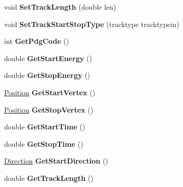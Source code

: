 \begin{DoxyCompactItemize}
\item 
\hypertarget{classParticle_a09fe260918298982e88d085bc02e367b}{void {\bfseries Set\-Track\-Length} (double len)}\label{classParticle_a09fe260918298982e88d085bc02e367b}

\item 
\hypertarget{classParticle_a9ab8ff63c2cdd3c634ef03d9a96d05a0}{void {\bfseries Set\-Track\-Start\-Stop\-Type} (tracktype tracktypein)}\label{classParticle_a9ab8ff63c2cdd3c634ef03d9a96d05a0}

\item 
\hypertarget{classParticle_ac4aef1157eca6d3e79adabca530b3b30}{int {\bfseries Get\-Pdg\-Code} ()}\label{classParticle_ac4aef1157eca6d3e79adabca530b3b30}

\item 
\hypertarget{classParticle_aa8a441034e0e6671e5e9067b2feb2532}{double {\bfseries Get\-Start\-Energy} ()}\label{classParticle_aa8a441034e0e6671e5e9067b2feb2532}

\item 
\hypertarget{classParticle_aedd7d21b6a8008a093499d604c72c8b2}{double {\bfseries Get\-Stop\-Energy} ()}\label{classParticle_aedd7d21b6a8008a093499d604c72c8b2}

\item 
\hypertarget{classParticle_a80f0b4c9a5dbca8cb91d6d0337b612bf}{\hyperlink{classPosition}{Position} {\bfseries Get\-Start\-Vertex} ()}\label{classParticle_a80f0b4c9a5dbca8cb91d6d0337b612bf}

\item 
\hypertarget{classParticle_aab18d092e2da1eccb353b8bffb8da8f6}{\hyperlink{classPosition}{Position} {\bfseries Get\-Stop\-Vertex} ()}\label{classParticle_aab18d092e2da1eccb353b8bffb8da8f6}

\item 
\hypertarget{classParticle_a1d2d7774c0a9bee3442afaec795e1af1}{double {\bfseries Get\-Start\-Time} ()}\label{classParticle_a1d2d7774c0a9bee3442afaec795e1af1}

\item 
\hypertarget{classParticle_a11103eaa90fb8e663bde050e91d4211c}{double {\bfseries Get\-Stop\-Time} ()}\label{classParticle_a11103eaa90fb8e663bde050e91d4211c}

\item 
\hypertarget{classParticle_a5c78bc2a89dc82fb79b4a4a812261a0c}{\hyperlink{classDirection}{Direction} {\bfseries Get\-Start\-Direction} ()}\label{classParticle_a5c78bc2a89dc82fb79b4a4a812261a0c}

\item 
\hypertarget{classParticle_acd3ba836f0d8d2ad816265aae6a045cc}{double {\bfseries Get\-Track\-Length} ()}\label{classParticle_acd3ba836f0d8d2ad816265aae6a045cc}


\end{DoxyCompactItemize}
